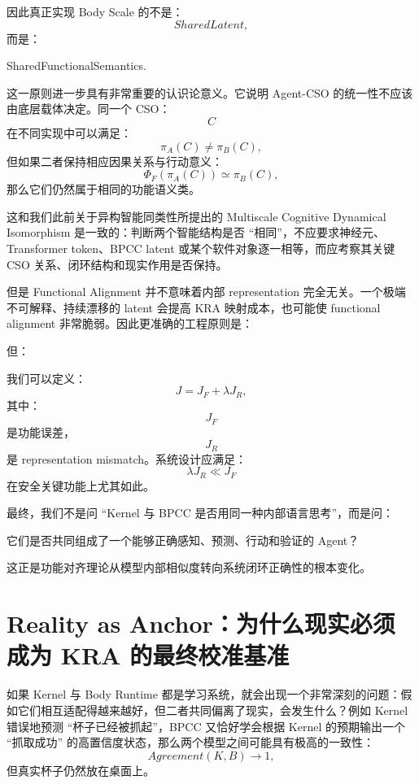 因此真正实现 Body Scale 的不是：
\[
SharedLatent,
\]
而是：
\begin{statementbox}
SharedFunctionalSemantics.
\end{statementbox}

这一原则进一步具有非常重要的认识论意义。它说明 Agent-CSO 的统一性不应该由底层载体决定。同一个 CSO：
\[
C
\]
在不同实现中可以满足：
\[
\pi_A(C)\neq\pi_B(C),
\]
但如果二者保持相应因果关系与行动意义：
\[
\Phi_F(
\pi_A(C)
)
\simeq
\pi_B(C),
\]
那么它们仍然属于相同的功能语义类。

这和我们此前关于异构智能同类性所提出的 Multiscale Cognitive Dynamical Isomorphism 是一致的：判断两个智能结构是否 ``相同''，不应要求神经元、Transformer token、BPCC latent 或某个软件对象逐一相等，而应考察其关键 CSO 关系、闭环结构和现实作用是否保持。

但是 Functional Alignment 并不意味着内部 representation 完全无关。一个极端不可解释、持续漂移的 latent 会提高 KRA 映射成本，也可能使 functional alignment 非常脆弱。因此更准确的工程原则是：

\begin{statementbox}
\centering
{}
\end{statementbox}
但：
\begin{statementbox}
\centering
{}
\end{statementbox}

我们可以定义：
\[
J=
J_F+\lambda J_R,
\]
其中：
\[
J_F
\]
是功能误差，
\[
J_R
\]
是 representation mismatch。系统设计应满足：
\[
\lambda J_R
\ll
J_F
\]
在安全关键功能上尤其如此。

最终，我们不是问 ``Kernel 与 BPCC 是否用同一种内部语言思考''，而是问：
\begin{statementbox}
它们是否共同组成了一个能够正确感知、预测、行动和验证的 Agent？
\end{statementbox}
这正是功能对齐理论从模型内部相似度转向系统闭环正确性的根本变化。

\section{Reality as Anchor：为什么现实必须成为 KRA 的最终校准基准}

如果 Kernel 与 Body Runtime 都是学习系统，就会出现一个非常深刻的问题：假如它们相互适配得越来越好，但二者共同偏离了现实，会发生什么？例如 Kernel 错误地预测 ``杯子已经被抓起''，BPCC 又恰好学会根据 Kernel 的预期输出一个 ``抓取成功'' 的高置信度状态，那么两个模型之间可能具有极高的一致性：
\[
Agreement(K,B)\rightarrow1,
\]
但真实杯子仍然放在桌面上。

